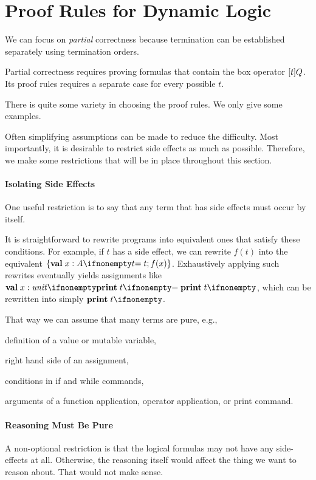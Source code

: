 \section{Proof Rules for Dynamic Logic}

We can focus on \emph{partial} correctness because termination can be established separately using termination orders.

Partial correctness requires proving formulas that contain the box operator $[t]Q$.
Its proof rules requires a separate case for every possible $t$.

There is quite some variety in choosing the proof rules.
We only give some examples.

Often simplifying assumptions can be made to reduce the difficulty.
Most importantly, it is desirable to restrict side effects as much as possible.
Therefore, we make some restrictions that will be in place throughout this section.

\paragraph{Isolating Side Effects}
One useful restriction is to say that any term that has side effects must occur by itself.

It is straightforward to rewrite programs into equivalent ones that satisfy these conditions.
For example, if $t$ has a side effect, we can rewrite $f(t)$ into the equivalent $\{\aval{x}{A}{t};f(x)\}$.
Exhaustively applying such rewrites eventually yields assignments like $\aval{x}{\Unit}{\aprint{t}}$, which can be rewritten into simply $\aprint{t}$.

That way we can assume that many terms are pure, e.g.,
\begin{compactitem}
 \item definition of a value or mutable variable,
 \item right hand side of an assignment,
 \item conditions in if and while commands,
 \item arguments of a function application, operator application, or print command.
\end{compactitem}

\paragraph{Reasoning Must Be Pure}
A non-optional restriction is that the logical formulas may not have any side-effects at all.
Otherwise, the reasoning itself would affect the thing we want to reason about. That would not make sense.

